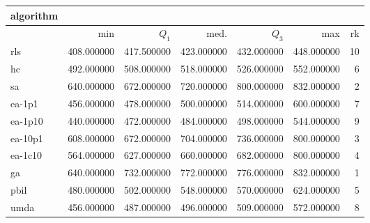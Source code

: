 \begin{tabular}{@{}l*{5}{>{{}}N{4}{0}}>{{}}N{2}{0}@{}}
\toprule
{algorithm} &  \\
\midrule
& {min} & {$Q_1$} & {med.} & {$Q_3$} & {max} & {rk}\\
\midrule
rls & 408.000000 & 417.500000 & 423.000000 & 432.000000 & 448.000000 & 10\\
hc & 492.000000 & 508.000000 & 518.000000 & 526.000000 & 552.000000 & 6\\
sa & {\color{blue}} 640.000000 & 672.000000 & 720.000000 & {\color{blue}} 800.000000 & {\color{blue}} 832.000000 & 2\\
ea-1p1 & 456.000000 & 478.000000 & 500.000000 & 514.000000 & 600.000000 & 7\\
ea-1p10 & 440.000000 & 472.000000 & 484.000000 & 498.000000 & 544.000000 & 9\\
ea-10p1 & 608.000000 & 672.000000 & 704.000000 & 736.000000 & 800.000000 & 3\\
ea-1c10 & 564.000000 & 627.000000 & 660.000000 & 682.000000 & 800.000000 & 4\\
ga & {\color{blue}} 640.000000 & {\color{blue}} 732.000000 & {\color{blue}} 772.000000 & 776.000000 & {\color{blue}} 832.000000 & 1\\
pbil & 480.000000 & 502.000000 & 548.000000 & 570.000000 & 624.000000 & 5\\
umda & 456.000000 & 487.000000 & 496.000000 & 509.000000 & 572.000000 & 8\\
\bottomrule
\end{tabular}
